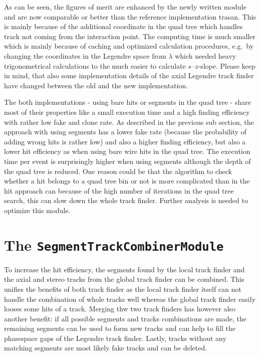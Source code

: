 As can be seen, the figures of merit are enhanced by the newly written module and are now comparable or better than the reference implementation trasan. This is mainly because of the additional coordinate in the quad tree which handles track not coming from the interaction point. The computing time is much smaller which is mainly because of caching and optimized calculation procedures, e.g.\ by changing the coordinates in the Legendre space from $\lambda$ which needed heavy trigonometrical calculations to the much easier to calculate $s$--$z$-slope. Please keep in mind, that also some implementation details of the axial Legendre track finder have changed between the old and the new implementation.

The both implementations - using bare hits or segments in the quad tree - share most of their properties like a small execution time and a high finding efficiency with rather low fake and clone rate. As described in the previous sub section, the approach with using segments has a lower fake rate (because the probability of adding wrong hits is rather low) and also a higher finding efficiency, but also a lower hit efficiency as when using bare wire hits in the quad tree. The execution time per event is surprisingly higher when using segments although the depth of the quad tree is reduced. One reason could be that the algorithm to check whether a hit belongs to a quad tree bin or not is more complicated than in the hit approach can because of the high number of iterations in the quad tree search, this can slow down the whole track finder. Further analysis is needed to optimize this module.

\section{The \texttt{SegmentTrackCombinerModule}} \label{section-combiner}

To increase the hit efficiency, the segments found by the local track finder and the axial and stereo tracks from the global track finder can be combined. This unifies the benefits of both track finder as the local track finder itself can not handle the combination of whole tracks well whereas the global track finder easily looses some hits of a track. Merging thw two track finders has however also another benefit: if all possible segments and tracks combinations are made, the remaining segments can be used to form new tracks and can help to fill the phasespace gaps of the Legendre track finder. Lastly, tracks without any matching segments are most likely fake tracks and can be deleted. 

